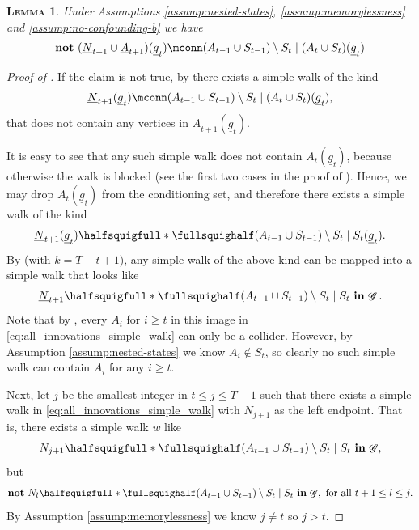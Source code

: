 \documentclass[12pt,a4paper]{article}
\newtheorem{lemma}[theorem]{\normalfont\scshape  Lemma}
\theoremstyle{definition}
\newcommand{\ingraph}[1]{~\textnormal{\bf in}\,#1}
\newcommand{\textnot}{\textnormal{\bf not}~}
\DeclareMathOperator{\gG}{\mathscr{G}}
\begin{document}
\begin{lemma}\label{lemma:innovation_action_memorylessness_gt_graph}
  Under Assumptions
  \ref{assump:nested-states}, \ref{assump:memorylessness} and \ref{assump:no-confounding-b}
  we have
    \begin{align*}
        \textnot (\underline{N}_{t+1} \cup \underline{A}_{t+1})(\underline{g}_t) \mconn (A_{t-1} \cup S_{t-1}) \setminus S_t \mid (A_t \cup S_t)(\underline{g}_t)
    \end{align*}
\end{lemma}
\begin{proof}[Proof of
  ]

  If the claim is not true, by  there exists
  a simple walk of the kind
  \[
    \underline{N}_{t+1}(\underline{g}_t) \mconn
    (A_{t-1} \cup S_{t-1}) \setminus S_t \mid (A_t \cup S_t)(\underline{g}_t),
  \]
  that does not contain any vertices in
  $\underline{A}_{t+1}(\underline{g}_t)$.

  It is easy to see that any such simple walk does not contain $A_t(\underline{g}_t)$, because otherwise the walk is blocked (see the first two cases in the proof of ). Hence, we may drop $A_t(\underline{g}_t)$ from the conditioning set, and therefore there exists a simple walk of the kind
  \[
  \underline{N}_{t+1}(\underline{g}_t) \halfsquigfull \ast \fullsquighalf
  (A_{t-1} \cup S_{t-1}) \setminus S_t \mid S_t(\underline{g}_t).
  \]
  By  (with $k = T - t + 1$), any simple walk of the above kind can be mapped into a simple walk that looks like
  \begin{align}\label{eq:all_innovations_simple_walk}
      \underline{N}_{t+1} \halfsquigfull \ast \fullsquighalf
          (A_{t-1} \cup S_{t-1}) \setminus S_t \mid S_t \ingraph{\gG}.
  \end{align}
  Note that by , every $A_i$ for $i \geq t$ in this image in \eqref{eq:all_innovations_simple_walk} can only be a collider. However, by Assumption \ref{assump:nested-states} we know $A_i \notin S_t$, so clearly no such simple walk can contain $A_i$ for any $i \geq t$.

  Next, let $j$ be the smallest integer in $t \leq j \leq T - 1$ such that there exists a simple walk in
  \eqref{eq:all_innovations_simple_walk} with $N_{j+1}$ as the left endpoint. That is, there exists a simple walk $w$ like
  \begin{align}\label{eq:innovation_simple_walk}
      N_{j+1} \halfsquigfull \ast \fullsquighalf
      (A_{t-1} \cup S_{t-1}) \setminus S_t \mid S_t \ingraph{\gG},
  \end{align}
  but
  \begin{align}\label{eq:no_innovation_simple_walk}
      \textnot N_l \halfsquigfull \ast \fullsquighalf (A_{t-1} \cup
    S_{t-1}) \setminus S_t \mid S_t \ingraph{\gG},~\text{for all}~t+1 \leq l \leq j.
  \end{align}
  By Assumption \ref{assump:memorylessness} we know $j \neq t$ so $j >
  t$.


\end{proof}
\end{document}
